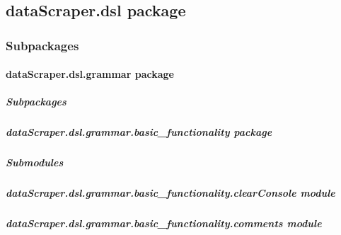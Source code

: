 \documentclass[letterpaper,10pt,english]{sphinxmanual}
\begin{document}
\subsection{dataScraper.dsl package}
\label{dataScraper.dsl:datascraper-dsl-package}\label{dataScraper.dsl::doc}

\subsubsection{Subpackages}
\label{dataScraper.dsl:subpackages}

\paragraph{dataScraper.dsl.grammar package}
\label{dataScraper.dsl.grammar:datascraper-dsl-grammar-package}\label{dataScraper.dsl.grammar::doc}

\subparagraph{Subpackages}
\label{dataScraper.dsl.grammar:subpackages}

\subparagraph{dataScraper.dsl.grammar.basic\_functionality package}
\label{dataScraper.dsl.grammar.basic_functionality::doc}\label{dataScraper.dsl.grammar.basic_functionality:datascraper-dsl-grammar-basic-functionality-package}

\subparagraph{Submodules}
\label{dataScraper.dsl.grammar.basic_functionality:submodules}

\subparagraph{dataScraper.dsl.grammar.basic\_functionality.clearConsole module}
\label{dataScraper.dsl.grammar.basic_functionality:datascraper-dsl-grammar-basic-functionality-clearconsole-module}\label{dataScraper.dsl.grammar.basic_functionality:module-dataScraper.dsl.grammar.basic_functionality.clearConsole}

\begin{fulllineitems}
\label{dataScraper.dsl.grammar.basic_functionality:dataScraper.dsl.grammar.basic_functionality.clearConsole.clearConsole}
\end{fulllineitems}



\subparagraph{dataScraper.dsl.grammar.basic\_functionality.comments module}
\label{dataScraper.dsl.grammar.basic_functionality:datascraper-dsl-grammar-basic-functionality-comments-module}\label{dataScraper.dsl.grammar.basic_functionality:module-dataScraper.dsl.grammar.basic_functionality.comments}
\end{document}
